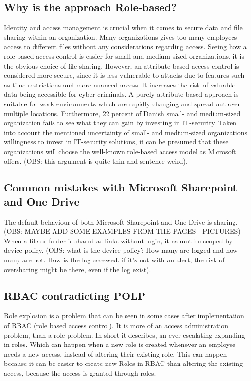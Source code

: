 \documentclass[12pt,a4paper]{article}
\begin{document}
\subsection{Why is the approach Role-based?}
Identity and access management is crucial when it comes to secure data and file sharing within an organization. Many organizations gives too many employees access to different files without any considerations regarding access. \cite{sikkerdigital} Seeing how a role-based access control is easier for small and medium-sized organizations, it is the obvious choice of file sharing. However, an attribute-based access control is considered more secure, since it is less vulnerable to attacks due to features such as time restrictions and more nuanced access.\cite{RBAC_vs._ABAC} It increases the risk of valuable data being accessible for cyber criminals. \cite{sikkerdigital} A purely attribute-based approach is suitable for work environments which are rapidly changing and spread out over multiple locations.\cite{Wikipedia} Furthermore, 22 percent of Danish small- and medium-sized organization fails to see what they can gain by investing in IT-security.\cite{Digital_SMV_2024} 
Taken into account the mentioned uncertainty of small- and medium-sized organizations willingness to invest in IT-security solutions, it can be presumed that these organizations will choose the well-known role-based access model as Microsoft offers. (OBS: this argument is quite thin and sentence weird).  

\subsection{Common mistakes with Microsoft Sharepoint and One Drive}
The default behaviour of both Microsoft Sharepoint and One Drive is sharing.\cite{Microsoft_oversharing} (OBS: MAYBE ADD SOME EXAMPLES FROM THE PAGES - PICTURES) When a file or folder is shared as links without login, it cannot be scoped by device policy.\cite{Microsoft_oversharing} (OBS: what is the device policy? How many are logged and how many are not. How is the log accessed: if it's not with an alert, the risk of oversharing might be there, even if the log exist). 


\subsection{RBAC contradicting POLP}
Role explosion is a problem that can be seen in some cases after implementation of RBAC (role based access control). It is more of an access administration problem, than a role problem. In short it describes, an ever escalating expanding in roles. \cite{role_explotion}
Which can happen when a new role is created whenever an employee needs a new access, instead of altering their existing role. This can happen because it can be easier to create new Roles in RBAC than altering the existing access, because the access is granted through roles. \cite{role_explotion}
\end{document}
